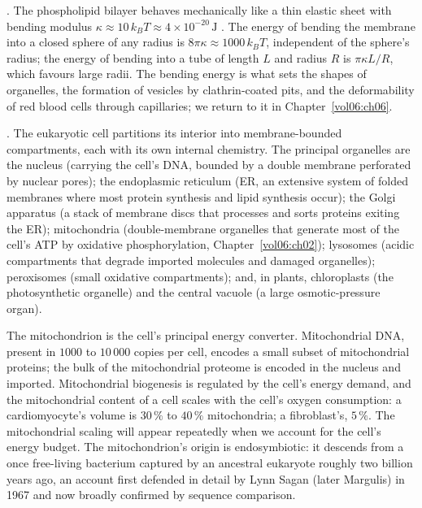 . The phospholipid
bilayer behaves mechanically like a thin elastic sheet with bending
modulus $\kappa \approx 10\,k_B T \approx 4 \times 10^{-20}\,\text{J}$
\cite{paper:v6c01-helfrich-1973,text:v6c01-phillips-physical-2012}.
The energy of bending the membrane into a closed sphere of any
radius is $8\pi \kappa \approx 1000\,k_B T$, independent of the
sphere's radius; the energy of bending into a tube of length $L$ and
radius $R$ is $\pi\kappa L / R$, which favours large radii. The
bending energy is what sets the shapes of organelles, the formation
of vesicles by clathrin-coated pits, and the deformability of red
blood cells through capillaries; we return to it in
Chapter~\ref{vol06:ch06}.

. The eukaryotic cell partitions its interior into
membrane-bounded compartments, each with its own internal chemistry.
The principal organelles are the nucleus (carrying the cell's DNA,
bounded by a double membrane perforated by nuclear pores); the
endoplasmic reticulum (ER, an extensive system of folded membranes
where most protein synthesis and lipid synthesis occur); the Golgi
apparatus (a stack of membrane discs that processes and sorts proteins
exiting the ER); mitochondria (double-membrane organelles that
generate most of the cell's ATP by oxidative phosphorylation,
Chapter~\ref{vol06:ch02}); lysosomes (acidic compartments that degrade
imported molecules and damaged organelles); peroxisomes (small
oxidative compartments); and, in plants, chloroplasts (the
photosynthetic organelle) and the central vacuole (a large
osmotic-pressure organ).

The mitochondrion is the cell's principal energy converter. Mitochondrial
DNA, present in $1000$ to $10\,000$ copies per cell, encodes a small
subset of mitochondrial proteins; the bulk of the mitochondrial
proteome is encoded in the nucleus and imported. Mitochondrial
biogenesis is regulated by the cell's energy demand, and the
mitochondrial content of a cell scales with the cell's oxygen
consumption: a cardiomyocyte's volume is $30\,\%$ to $40\,\%$
mitochondria; a fibroblast's, $5\,\%$. The mitochondrial scaling will
appear repeatedly when we account for the cell's energy budget. The
mitochondrion's origin is endosymbiotic: it descends from a once
free-living bacterium captured by an ancestral eukaryote roughly two
billion years ago, an account first defended in detail by Lynn Sagan
(later Margulis) in 1967 \cite{paper:v6c01-margulis-1967} and now
broadly confirmed by sequence comparison.

